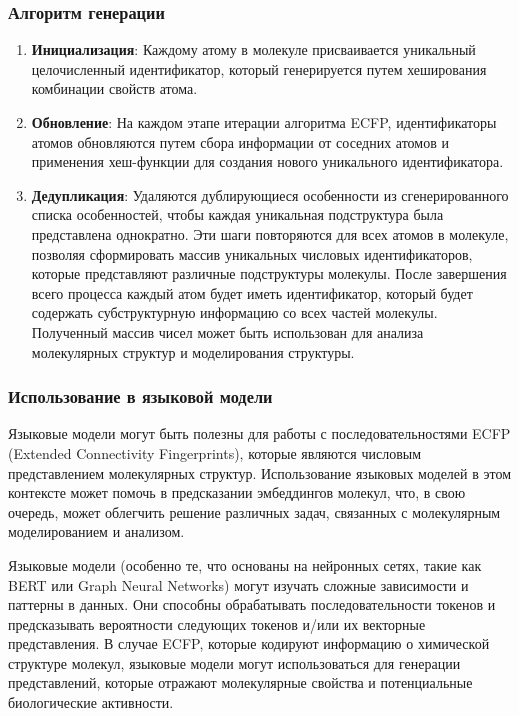 \subsubsection{Алгоритм генерации}
\begin{enumerate}
\item \textbf{Инициализация}: Каждому атому в молекуле присваивается уникальный целочисленный идентификатор, который генерируется путем хеширования комбинации свойств атома.
\item \textbf{Обновление}: На каждом этапе итерации алгоритма ECFP, идентификаторы атомов обновляются путем сбора информации от соседних атомов и применения хеш-функции для создания нового уникального идентификатора.
\item \textbf{Дедупликация}: Удаляются дублирующиеся особенности из сгенерированного списка особенностей, чтобы каждая уникальная подструктура была представлена однократно.
\newline
\newline Эти шаги повторяются для всех атомов в молекуле, позволяя сформировать массив уникальных числовых идентификаторов, которые представляют различные подструктуры молекулы. После завершения всего процесса каждый атом будет иметь идентификатор, который будет содержать субструктурную информацию со всех частей молекулы. Полученный массив чисел может быть использован для анализа молекулярных структур и моделирования структуры. 
\end{enumerate}


\subsubsection{Использование в языковой модели}
Языковые модели могут быть полезны для работы с последовательностями ECFP (Extended Connectivity Fingerprints), которые являются числовым представлением молекулярных структур. Использование языковых моделей в этом контексте может помочь в предсказании эмбеддингов молекул, что, в свою очередь, может облегчить решение различных задач, связанных с молекулярным моделированием и анализом.

Языковые модели (особенно те, что основаны на нейронных сетях, такие как BERT или Graph Neural Networks) могут изучать сложные зависимости и паттерны в данных. Они способны обрабатывать последовательности токенов и предсказывать вероятности следующих токенов и/или их векторные представления. В случае ECFP, которые кодируют информацию о химической структуре молекул, языковые модели могут использоваться для генерации представлений, которые отражают молекулярные свойства и потенциальные биологические активности.

